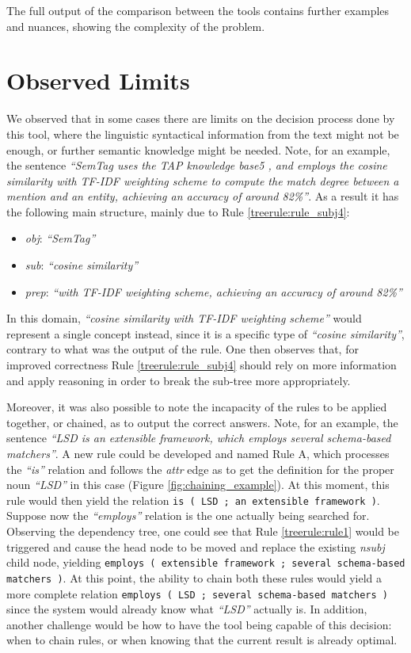 \documentclass[11pt,a4paper,openright]{memoir}
\begin{document}
The full output of the comparison between the tools contains further examples and nuances, showing the complexity of the problem.


\section{Observed Limits}
\label{section:observations}

We observed that in some cases there are limits on the decision process done by this tool, where the linguistic syntactical information from the text might not be enough, or further semantic knowledge might be needed. Note, for an example, the sentence \emph{\enquote{SemTag uses the TAP knowledge base5 , and employs the cosine similarity with TF-IDF weighting scheme to compute the match degree between a mention and an entity, achieving an accuracy of around 82\%}}. As a result it has the following main structure, mainly due to Rule \ref{treerule:rule_subj4}:
	\begin{itemize}
	  \item \emph{obj}: \emph{\enquote{SemTag}}
	  \item \emph{sub}: \emph{\enquote{cosine similarity}}
	  \item \emph{prep}: \emph{\enquote{with TF-IDF weighting scheme, achieving an accuracy of around 82\%}}
	\end{itemize}

In this domain, \emph{\enquote{cosine similarity with TF-IDF weighting scheme}} would represent a single concept instead, since it is a specific type of \emph{\enquote{cosine similarity}}, contrary to what was the output of the rule. One then observes that, for improved correctness Rule \ref{treerule:rule_subj4} should rely on more information and apply reasoning in order to break the sub-tree more appropriately.

Moreover, it was also possible to note the incapacity of the rules to be applied together, or chained, as to output the correct answers. Note, for an example, the sentence \emph{\enquote{LSD is an extensible framework, which employs several schema-based matchers}}. A new rule could be developed and named Rule A, which processes the \emph{\enquote{is}} relation and follows the \emph{attr} edge as to get the definition for the proper noun \emph{\enquote{LSD}} in this case (Figure \ref{fig:chaining_example}). At this moment, this rule would then yield the relation \texttt{is ( LSD ; an extensible framework )}. Suppose now the \emph{\enquote{employs}} relation is the one actually being searched for. Observing the dependency tree, one could see that Rule \ref{treerule:rule1} would be triggered and cause the head node to be moved and replace the existing \emph{nsubj} child node, yielding \texttt{employs	( extensible framework ; several schema-based matchers )}. At this point, the ability to chain both these rules would yield a more complete relation \texttt{employs	( LSD ; several schema-based matchers )} since the system would already know what \emph{\enquote{LSD}} actually is. In addition, another challenge would be how to have the tool being capable of this decision: when to chain rules, or when knowing that the current result is already optimal.
\end{document}
